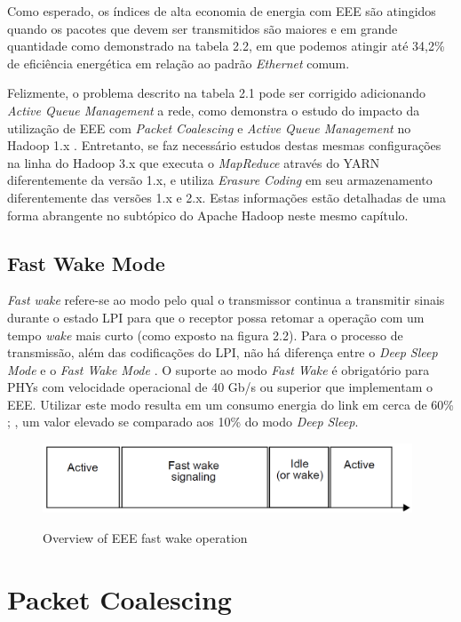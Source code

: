 Como esperado, os índices de alta economia de energia com EEE são atingidos quando os pacotes que devem ser transmitidos são maiores e em grande quantidade como demonstrado na tabela 2.2, em que podemos atingir até 34,2\% de eficiência energética em relação ao padrão \emph{Ethernet} comum.

Felizmente, o problema descrito na tabela 2.1 pode ser corrigido adicionando \emph{Active Queue Management} a rede, como demonstra o estudo do impacto da utilização de EEE com \emph{Packet Coalescing} e \emph{Active Queue Management} no Hadoop 1.x \cite{silva2018eon}. Entretanto, se faz necessário estudos destas mesmas configurações na linha do Hadoop 3.x que executa o \emph{MapReduce} através do YARN diferentemente da versão 1.x, e utiliza \emph{Erasure Coding} em seu armazenamento diferentemente das versões 1.x e 2.x. Estas informações estão detalhadas de uma forma abrangente no subtópico do Apache Hadoop neste mesmo capítulo.

\subsection{Fast Wake Mode}

\emph{Fast wake} refere-se ao modo pelo qual o transmissor continua a transmitir sinais durante o estado LPI para que o receptor possa retomar a operação com um tempo \emph{wake} mais curto (como exposto na figura 2.2). Para o processo de transmissão, além das codificações do LPI, não há diferença entre o \emph{Deep Sleep Mode} e o \emph{Fast Wake Mode} \cite{6891095}. O suporte ao modo \emph{Fast Wake} é obrigatório para PHYs com velocidade operacional de 40 Gb/s ou superior que implementam o EEE. Utilizar este modo resulta em um consumo energia do link em cerca de 60\% \cite{georgakoudis2019evaluating}; \cite{6891095}, um valor elevado se comparado aos 10\% do modo \emph{Deep Sleep}.

\begin{figure}[htp]
    \centering
    \includegraphics[width=11cm]{2-fundam/FastWakeMode.PNG}
    \caption{Overview of EEE fast wake operation}
    \cite{6891095}
    \label{fig:eeefastwakemode}
\end{figure}

\section{Packet Coalescing}


